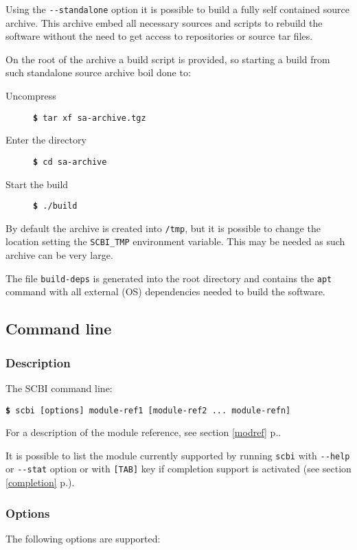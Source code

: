 \documentclass[a4paper,12pt,twoside]{article}
\newcommand{\code}[1]{\texttt{#1}}
\newcommand{\seeref}[1]{see section \ref{#1} p.\pageref{#1}}
\newcommand{\cmd}[1]{\tabto{1cm}\hspace{0.5cm}\texttt{\textbf{\$} #1}}
\newcommand{\ddash}{-{}-}
\begin{document}
Using the \code{\ddash{}standalone} option it is possible to build a fully self contained source archive. This archive embed all necessary sources and scripts to rebuild the software without the need to get access to repositories or source tar files.

On the root of the archive a build script is provided, so starting a build from such standalone source archive boil done to:

\begin{description}
	\item[Uncompress] \cmd{tar xf sa-archive.tgz}
	\item[Enter the directory] \cmd{cd sa-archive}
	\item[Start the build] \cmd{./build}
\end{description}

By default the archive is created into \code{/tmp}, but it is possible to change the location setting the \code{SCBI\_TMP} environment variable. This may be needed as such archive can be very large.

The file \code{build-deps} is generated into the root directory and contains the \code{apt} command with all external (OS) dependencies needed to build the software.

\subsection{Command line}

\subsubsection{Description}

The SCBI command line:

\cmd{scbi [options] module-ref1 [module-ref2 ... module-refn]}

For a description of the module reference, \seeref{modref}.

It is possible to list the module currently supported by running \code{scbi} with \code{\ddash{}help} or \code{\ddash{}stat} option or with \code{[TAB]} key if completion support is activated (\seeref{completion}).

\subsubsection{Options}
\label{cmdline}

The following options are supported:
\end{document}
